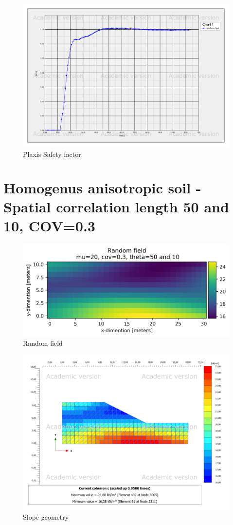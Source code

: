 \begin{figure}[h]
	\includegraphics[width=\textwidth]{fig/Chart1}
	\caption{Plaxis Safety factor}
	\label{fig:psf1}
\end{figure}



\section{Homogenus anisotropic soil - Spatial correlation length 50 and 10, COV=0.3}

\begin{figure}[h]
	\includegraphics[width=\textwidth]{fig/testRF2}
	\caption{Random field}
	\label{fig:p3}
\end{figure}

\begin{figure}[h]
	\includegraphics[width=\textwidth]{fig/testp2}
	\caption{Slope geometry}
	\label{fig:p4}
\end{figure}

